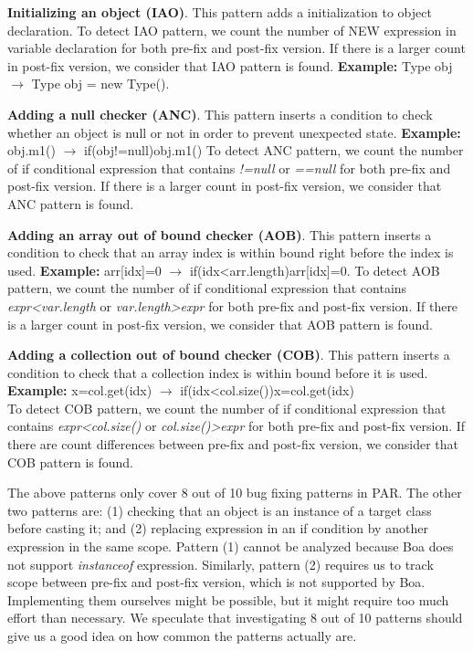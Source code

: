 \documentclass{sig-alternate-05-2015}
\begin{document}
\vspace{1ex}
\noindent
 {\bf Initializing an object (IAO)}. This pattern adds a initialization to object declaration.
  To detect IAO pattern, we count the number of NEW expression in variable
  declaration for both pre-fix and post-fix version. If there is a larger count in post-fix version, we consider that IAO pattern
  is found.
	{\bf Example:} Type obj $\rightarrow$ Type obj = new Type(). 

\vspace{1ex}
\noindent
 {\bf Adding a null checker (ANC)}.  This pattern inserts a condition to check whether an
    object is null or not in order to prevent unexpected state.
	{\bf Example:} obj.m1() $\rightarrow$ if(obj!=null){obj.m1()}
  To detect ANC pattern, we count the number of if conditional expression that
  contains {\em !=null} or {\em ==null} for both pre-fix and post-fix
  version. If there is a larger count in post-fix version,
  we consider that ANC pattern is found.

\vspace{1ex}
\noindent
 {\bf Adding an array out of bound checker (AOB)}. This pattern inserts a condition to check that an array
    index is within bound right before the index is used.
	{\bf Example:} arr[idx]=0 $\rightarrow$ if(idx<arr.length){arr[idx]=0}.
  To detect AOB pattern, we count the number of if conditional expression that
  contains {\em expr<var.length} or {\em var.length>expr} for both pre-fix and
  post-fix version. If there is a larger count in post-fix version, we consider that AOB pattern is found.

\vspace{1ex}
\noindent
 {\bf Adding a collection out of bound checker (COB)}.  This pattern inserts a condition to check that a
    collection index is within bound before it is used.
	{\bf Example:} x=col.get(idx) $\rightarrow$ if(idx<col.size()){x=col.get(idx)}\\
To detect COB pattern, we count the number of if conditional expression that
contains {\em expr<col.size()} or {\em col.size()>expr} for both pre-fix and
post-fix version. If there are count differences between pre-fix and post-fix
version, we consider that COB pattern is found.

\vspace{1ex} The above patterns only cover 8 out of 10 bug fixing patterns in
PAR. The other two patterns are: (1) checking that an object is an instance of a
target class before casting it; and (2) replacing expression in an if condition
by another expression in the same scope. Pattern (1) cannot be analyzed because
Boa does not support {\em instanceof} expression. Similarly, pattern (2)
requires us to track scope between pre-fix and post-fix version, which is not
supported by Boa. Implementing them ourselves might be possible, but it might
require too much effort than necessary. We speculate that investigating 8 out of
10 patterns should give us a good idea on how common the patterns actually are.
\end{document}
